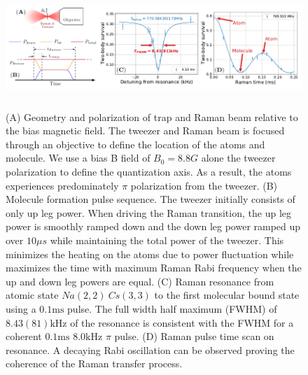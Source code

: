 \documentclass[aps,prl,twocolumn,groupedaddress]{revtex4-1}
\begin{document}
\begin{figure}
  \includegraphics[height=4.5cm]{fig2.pdf}
  \caption{
    (A) Geometry and polarization of trap and Raman beam relative to the bias magnetic field.
    The tweezer and Raman beam is focused through an objective to define the location of the
    atoms and molecule.
    We use a bias B field of $B_0=8.8 G$ alone the tweezer polarization
    to define the quantization axis.
    As a result, the atoms experiences predominately $\pi$ polarization from the tweezer.
    (B) Molecule formation pulse sequence. The tweezer initially consists of only up leg power.
    When driving the Raman transition, the up leg power is smoothly ramped down and
    the down leg power ramped up over $10\mu s$ while maintaining the total power of the tweezer.
    This minimizes the heating on the atoms due to power fluctuation while maximizes the time
    with maximum Raman Rabi frequency when the up and down leg powers are equal.
    (C) Raman resonance from atomic state $Na(2,2)\ Cs(3,3)$ to the first molecular bound state
    using a $0.1\mathrm{ms}$ pulse.
    The full width half maximum (FWHM) of $8.43(81) \mathrm{kHz}$ of the resonance
    is consistent with the FWHM for a coherent $0.1\mathrm{ms}$ $8.0 \mathrm{kHz}$ $\pi$ pulse.
    (D) Raman pulse time scan on resonance. A decaying Rabi oscillation can be observed
    proving the coherence of the Raman transfer process.
    \label{f-raman}}
\end{figure}
\end{document}
